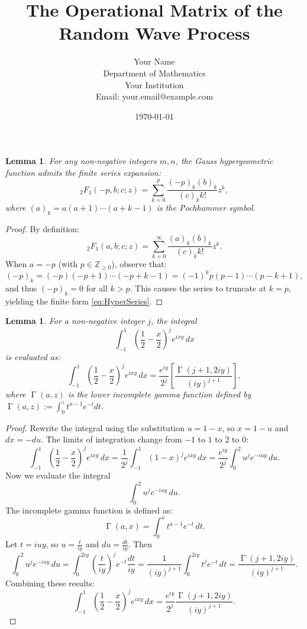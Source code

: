\documentclass[12pt]{article}
\title{The Operational Matrix of the Random Wave Process}
\author{Your Name \\ Department of Mathematics \\ Your Institution \\ Email: your.email@example.com}
\date{\today}
\newtheorem{lemma}[theorem]{Lemma}
\DeclareMathOperator{\gamma}{\Gamma}
\begin{document}
\maketitle

\begin{lemma}\label{lem:HyperExpansions}
For any non-negative integers $m, n$, the Gauss hypergeometric function admits the finite series expansion:
\begin{equation}\label{eq:HyperSeries}
{}_2F_1(-p, b; c; z) = \sum_{k=0}^p \frac{(-p)_k (b)_k}{(c)_k k!} z^k,
\end{equation}
where $(a)_k = a(a+1)\cdots(a+k-1)$ is the Pochhammer symbol.
\end{lemma}

\begin{proof}
By definition:
\[
{}_2F_1(a, b; c; z) = \sum_{k=0}^\infty \frac{(a)_k (b)_k}{(c)_k k!} z^k.
\]
When $a = -p$ (with \( p \in \mathbb{Z}_{\geq 0} \)), observe that:
\[
(-p)_k = (-p)(-p+1)\cdots(-p+k-1) = (-1)^k p(p-1)\cdots(p-k+1),
\]
and thus $(-p)_k = 0$ for all $k>p$. This causes the series to truncate at $k=p$, yielding the finite form \eqref{eq:HyperSeries}.
\end{proof}

\begin{lemma}\label{lem:IntegralGamma}
For a non-negative integer $j$, the integral
\[
\int_{-1}^1 \left(\frac{1}{2}-\frac{x}{2}\right)^j e^{i x y} \, dx
\]
is evaluated as:
\begin{equation}\label{eq:IntegralGamma}
\int_{-1}^1 \left(\frac{1}{2}-\frac{x}{2}\right)^j e^{i x y} \, dx =
\frac{e^{iy}}{2^j}\left[\frac{\gamma(j+1,2iy)}{(iy)^{j+1}}\right],
\end{equation}
where $\gamma(a, z)$ is the lower incomplete gamma function defined by $\gamma(a, z) := \int_0^z t^{a-1} e^{-t} dt$.
\end{lemma}

\begin{proof}
Rewrite the integral using the substitution \(u = 1 - x\), so \(x = 1 - u\) and \(dx = -du\). The limits of integration change from $-1$ to $1$ to $2$ to $0$:
\[
\int_{-1}^1 \left(\frac{1}{2} - \frac{x}{2}\right)^j e^{i x y} \, dx = \frac{1}{2^j} \int_{-1}^1 (1-x)^j e^{i x y} \, dx = \frac{e^{iy}}{2^j} \int_{0}^{2} u^j e^{-i u y} \, du.
\]
Now we evaluate the integral
\[
\int_0^2 u^j e^{-i u y} \, du.
\]
The incomplete gamma function is defined as:
\[
\gamma(a, x) = \int_0^x t^{a-1} e^{-t} \, dt.
\]
Let \(t = iuy\), so \(u = \frac{t}{iy}\) and \(du = \frac{dt}{iy}\). Then
\[
\int_0^2 u^j e^{-i u y} \, du = \int_0^{2iy} \left(\frac{t}{iy}\right)^j e^{-t} \frac{dt}{iy} = \frac{1}{(iy)^{j+1}} \int_0^{2iy} t^j e^{-t} \, dt = \frac{\gamma(j+1, 2iy)}{(iy)^{j+1}}.
\]
Combining these results:
\[
\int_{-1}^1 \left(\frac{1}{2} - \frac{x}{2}\right)^j e^{i x y} \, dx = \frac{e^{iy}}{2^j} \frac{\gamma(j+1, 2iy)}{(iy)^{j+1}}.
\]
\end{proof}
\end{document}
